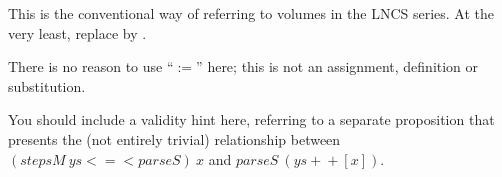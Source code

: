 This is the conventional way of referring to volumes in the LNCS series. At the very least, replace  by .



There is no reason to use ``$:=$'' here; this is not an assignment, definition or substitution.
\replace{
$:=$
}{
$=$
}

You should include a validity hint here, referring to a separate proposition that presents the (not entirely trivial) relationship between $(stepsM~ys <\!\!\!=\!\!\!<parseS)~x$ and $parseS~(ys+\!\!\!\!+[ x ])$.
